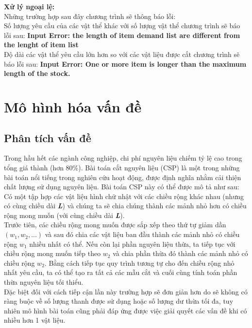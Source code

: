 \documentclass[a4paper]{article}
\begin{document}
\indent \textbf{Xử lý ngoại lệ:}\\
\indent Những trường hợp sau đây chương trình sẽ thông báo lỗi: \\
\indent\indent \text{-} Số lượng yêu cầu của các vật thể khác với số lượng vật thể chương trình sẽ báo lỗi sau: \textbf{Input Error: the length of item demand list are different from the lenght of item list}\\
\indent\indent \text{-} Độ dài các vật thể yêu cầu lớn hơn so với các vật liệu được cắt chương trình sẽ báo lỗi sau: \textbf{Input Error: One or more item is longer than the maximum length of the stock.}

   
   
   




\section{Mô hình hóa vấn đề}
\subsection{Phân tích vấn đề}
\indent \indent Trong hầu hết các ngành công nghiệp, chi phí nguyên liệu chiếm tỷ lệ cao trong tổng giá thành (hơn 80\%). Bài toán cắt nguyên liệu (CSP) là một trong những bài toán nổi tiếng trong nghiên cứu hoạt động, được định nghĩa nhằm cải thiện chất lượng sử dụng nguyên liệu. Bài toán CSP này có thể được mô tả như sau: Có một tập hợp các vật liệu hình chữ nhật với các chiều rộng khác nhau (nhưng có cùng chiều dài \textbf{\textit{L}}) và chúng ta sẽ chia chúng thành các mảnh nhỏ hơn có chiều rộng mong muốn (với cùng chiều dài \textbf{\textit{L}}).\\
\indent Trước tiên, các chiều rộng mong muốn được sắp xếp theo thứ tự giảm dần $(w_{1}, w_{2},...)$ và sau đó chia các vật liệu ban đầu thành các mảnh nhỏ có chiều rộng $w_{1}$ nhiều nhất có thể. Nếu còn lại phần nguyên liệu thừa, ta tiếp tục với chiều rộng mong muốn tiếp theo $w_{2}$ và chia phần thừa đó thành các mảnh nhỏ có chiều rộng $w_{2}$. Bằng cách tiếp tục quy trình tương tự cho đến chiều rộng nhỏ nhất yêu cầu, ta có thể tạo ra tất cả các mẫu cắt và cuối cùng tính toán phần thừa nguyên liệu tối thiểu.\\
\indent Đặc biệt đối với cách tiếp cận lần này trường hợp sẽ đơn giản hơn do sẽ không có ràng buộc về số lượng thanh được sử dụng hoặc số lượng dư thừa tối đa, tuy nhiên mô hình bài toán cũng phải đáp ứng được việc giải quyết các vấn đề khi có nhiều hơn 1 vật liệu.
\end{document}
